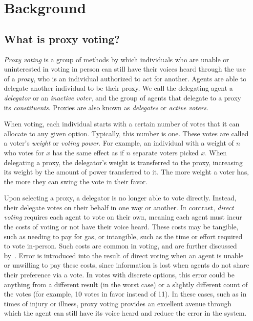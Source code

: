 \section{Background}\label{sec:background}  %

\subsection{What is proxy voting?}\label{subsec:what-is-proxy-voting?}
\textit{Proxy voting} is a group of methods by which individuals who are unable or
uninterested in voting in person can still have their voices heard through the use of
a \textit{proxy}, who is an individual authorized to act for another.
Agents are able to delegate another individual to be their proxy.
We call the delegating agent a \textit{delegator} or an \textit{inactive voter}, and
the group of agents that delegate to a proxy its \textit{constituents}.
Proxies are also known as \textit{delegates} or \textit{active voters}.

When voting, each individual starts with a certain number of votes that it can
allocate to any given option.
Typically, this number is one.
These votes are called a voter's \textit{weight} or \textit{voting power}.
For example, an individual with a weight of $n$ who votes for $x$ has the same effect
as if $n$ separate voters picked $x$.
When delegating a proxy, the delegator's weight is transferred to the proxy,
increasing its weight by the amount of power transferred to it.
The more weight a voter has, the more they can swing the vote in their favor.

Upon selecting a proxy, a delegator is no longer able to vote directly.
Instead, their delegate votes on their behalf in one way or another.
In contrast, \textit{direct voting} requires each agent to vote on their own, meaning
each agent must incur the costs of voting or not have their voice heard.
These costs may be tangible, such as needing to pay for gas, or intangible, such as
the time or effort required to vote in-person.
Such costs are common in voting, and are further discussed by~\cite{Gershtein2019}.
Error is introduced into the result of direct voting when an agent is unable or
unwilling to pay these costs, since information is lost when agents do not share
their preference via a vote.
In votes with discrete options, this error could be anything from a different result
(in the worst case) or a slightly different count of the votes (for example, 10
votes in favor instead of 11).
In these cases, such as in times of injury or illness, proxy voting provides an
excellent avenue through which the agent can still have its voice heard and reduce
the error in the system.

